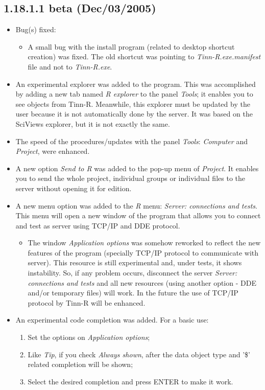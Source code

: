 \subsection{1.18.1.1 beta (Dec/03/2005)}

\begin{itemize}
  \item Bug(s) fixed:
    \begin{itemize}
      \item A small bug with the install program (related to desktop shortcut creation) was fixed.
        The old shortcut was pointing
        to \textit{Tinn-R.exe.manifest} file and not to \textit{Tinn-R.exe}.
    \end{itemize}
  \item An experimental \RR{} explorer was added to the program. This was
    accomplished by adding a new tab named \textit{R explorer} to the panel
    \textit{Tools}; it enables you to see \RR{} objects from
    Tinn-R. Meanwhile, this explorer must be updated by the user
    because it is not automatically done by the \RR{} server.
    It was based on the SciViews \RR{} explorer, but it is not exactly
    the same.
  \item The speed of the procedures/updates with the panel \textit{Tools}:
    \textit{Computer} and \textit{Project}, were enhanced.
  \item A new option \textit{Send to R} was added to the pop-up menu of
    \textit{Project}. It enables you to send the whole project,
    individual groups or individual files to the server without
    opening it for edition.
  \item A new menu option was added to the \textit{R} menu:
    \textit{Server: connections and tests}. This menu will open a
    new window of the program that allows you to connect and test
    \RR{} as server using TCP/IP and DDE protocol.
    \begin{itemize}
      \item The window \textit{Application options} was somehow reworked
        to reflect the new features of the program (specially TCP/IP
        protocol to communicate with \RR{} server). This resource is
        still experimental and, under tests, it shows instability. So,
        if any problem occurs, disconnect the server
        \textit{Server: connections and tests} and all new resources
        (using another option - DDE and/or temporary files) will work.
        In the future the use of TCP/IP protocol by Tinn-R will be
        enhanced.
    \end{itemize}
  \item An experimental code completion was added. For a basic use:
    \begin{enumerate}
      \item Set the options on \textit{Application options};
      \item Like \textit{Tip}, if you check \textit{Always shown}, after the
        data object type and '\$' related completion will be shown;
      \item Select the desired completion and press ENTER to make it work.


\end{enumerate}
\end{itemize}
